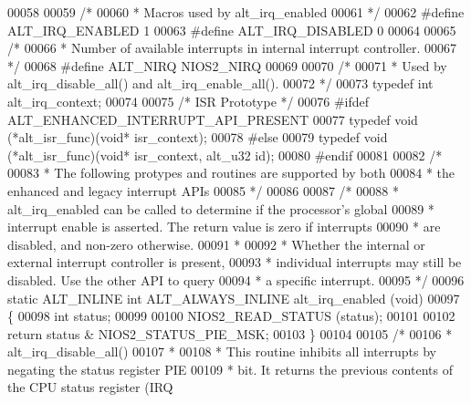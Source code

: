 \begin{DoxyCode}
00058 
00059 \textcolor{comment}{/*}
00060 \textcolor{comment}{ * Macros used by alt\_irq\_enabled}
00061 \textcolor{comment}{ */}
00062 \textcolor{preprocessor}{#define ALT\_IRQ\_ENABLED  1}
00063 \textcolor{preprocessor}{#define ALT\_IRQ\_DISABLED 0  }
00064 
00065 \textcolor{comment}{/* }
00066 \textcolor{comment}{ * Number of available interrupts in internal interrupt controller.}
00067 \textcolor{comment}{ */}
00068 \textcolor{preprocessor}{#define ALT\_NIRQ NIOS2\_NIRQ}
00069 
00070 \textcolor{comment}{/*}
00071 \textcolor{comment}{ * Used by alt\_irq\_disable\_all() and alt\_irq\_enable\_all().}
00072 \textcolor{comment}{ */}
00073 \textcolor{keyword}{typedef} \textcolor{keywordtype}{int} alt_irq_context;
00074 
00075 \textcolor{comment}{/* ISR Prototype */}
00076 \textcolor{preprocessor}{#ifdef ALT\_ENHANCED\_INTERRUPT\_API\_PRESENT}
00077 \textcolor{keyword}{typedef} void (*alt_isr_func)(\textcolor{keywordtype}{void}* isr\_context);
00078 \textcolor{preprocessor}{#else}
00079 \textcolor{keyword}{typedef} void (*alt_isr_func)(\textcolor{keywordtype}{void}* isr\_context, alt_u32 id);
00080 \textcolor{preprocessor}{#endif}
00081 
00082 \textcolor{comment}{/*}
00083 \textcolor{comment}{ * The following protypes and routines are supported by both}
00084 \textcolor{comment}{ * the enhanced and legacy interrupt APIs}
00085 \textcolor{comment}{ */}
00086  
00087 \textcolor{comment}{/*}
00088 \textcolor{comment}{ * alt\_irq\_enabled can be called to determine if the processor's global}
00089 \textcolor{comment}{ * interrupt enable is asserted. The return value is zero if interrupts }
00090 \textcolor{comment}{ * are disabled, and non-zero otherwise.}
00091 \textcolor{comment}{ *}
00092 \textcolor{comment}{ * Whether the internal or external interrupt controller is present, }
00093 \textcolor{comment}{ * individual interrupts may still be disabled. Use the other API to query}
00094 \textcolor{comment}{ * a specific interrupt. }
00095 \textcolor{comment}{ */}
00096 \textcolor{keyword}{static} ALT_INLINE \textcolor{keywordtype}{int} ALT_ALWAYS_INLINE alt_irq_enabled (\textcolor{keywordtype}{void})
00097 \{
00098   \textcolor{keywordtype}{int} status;
00099 
00100   NIOS2_READ_STATUS (status);
00101 
00102   \textcolor{keywordflow}{return} status & NIOS2_STATUS_PIE_MSK; 
00103 \}
00104 
00105 \textcolor{comment}{/*}
00106 \textcolor{comment}{ * alt\_irq\_disable\_all() }
00107 \textcolor{comment}{ *}
00108 \textcolor{comment}{ * This routine inhibits all interrupts by negating the status register PIE }
00109 \textcolor{comment}{ * bit. It returns the previous contents of the CPU status register (IRQ }

\end{DoxyCode}
